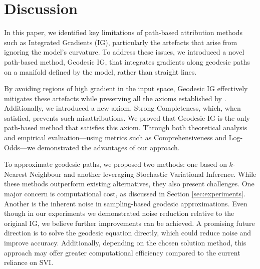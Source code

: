\section{Discussion} \label{sec:discussion}

In this paper, we identified key limitations of path-based attribution methods such as Integrated Gradients (IG), particularly the artefacts that arise from ignoring the model’s curvature. To address these issues, we introduced a novel path-based method, Geodesic IG, that integrates gradients along geodesic paths on a manifold defined by the model, rather than straight lines.

By avoiding regions of high gradient in the input space, Geodesic IG effectively mitigates these artefacts while preserving all the axioms established by \citet{sundararajan2017axiomatic}. Additionally, we introduced a new axiom, Strong Completeness, which, when satisfied, prevents such misattributions. We proved that Geodesic IG is the only path-based method that satisfies this axiom. Through both theoretical analysis and empirical evaluation—using metrics such as Comprehensiveness and Log-Odds—we demonstrated the advantages of our approach.

To approximate geodesic paths, we proposed two methods: one based on $k$-Nearest Neighbour and another leveraging Stochastic Variational Inference. While these methods outperform existing alternatives, they also present challenges. One major concern is computational cost, as discussed in Section \ref{sec:experiments}. Another is the inherent noise in sampling-based geodesic approximations. Even though in our experiments we demonstrated noise reduction relative to the original IG, we believe further improvements can be achieved. A promising future direction is to solve the geodesic equation directly, which could reduce noise and improve accuracy. Additionally, depending on the chosen solution method, this approach may offer greater computational efficiency compared to the current reliance on SVI.